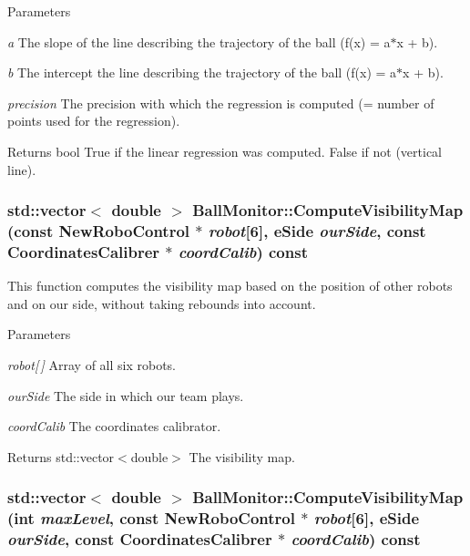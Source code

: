 \begin{DoxyParams}{Parameters}
\item[{\em a}]The slope of the line describing the trajectory of the ball (f(x) = a$\ast$x + b). \item[{\em b}]The intercept the line describing the trajectory of the ball (f(x) = a$\ast$x + b). \item[{\em precision}]The precision with which the regression is computed (= number of points used for the regression). \end{DoxyParams}
\begin{DoxyReturn}{Returns}
bool True if the linear regression was computed. False if not (vertical line). 
\end{DoxyReturn}
\hypertarget{classBallMonitor_ac30119e22cfe4814670c4eae8c6b5495}{
\subsubsection[{ComputeVisibilityMap}]{\setlength{\rightskip}{0pt plus 5cm}std::vector$<$ double $>$ BallMonitor::ComputeVisibilityMap (const {\bf NewRoboControl} $\ast$ {\em robot}\mbox{[}6\mbox{]}, \/  eSide {\em ourSide}, \/  const {\bf CoordinatesCalibrer} $\ast$ {\em coordCalib}) const}}
\label{classBallMonitor_ac30119e22cfe4814670c4eae8c6b5495}


This function computes the visibility map based on the position of other robots and on our side, without taking rebounds into account. 


\begin{DoxyParams}{Parameters}
\item[{\em robot\mbox{[}$\,$\mbox{]}}]Array of all six robots. \item[{\em ourSide}]The side in which our team plays. \item[{\em coordCalib}]The coordinates calibrator. \end{DoxyParams}
\begin{DoxyReturn}{Returns}
std::vector$<$double$>$ The visibility map. 
\end{DoxyReturn}
\hypertarget{classBallMonitor_aad046acf9df6b0381ab3b1b8351e97c5}{
\subsubsection[{ComputeVisibilityMap}]{\setlength{\rightskip}{0pt plus 5cm}std::vector$<$ double $>$ BallMonitor::ComputeVisibilityMap (int {\em maxLevel}, \/  const {\bf NewRoboControl} $\ast$ {\em robot}\mbox{[}6\mbox{]}, \/  eSide {\em ourSide}, \/  const {\bf CoordinatesCalibrer} $\ast$ {\em coordCalib}) const}}
\label{classBallMonitor_aad046acf9df6b0381ab3b1b8351e97c5}


